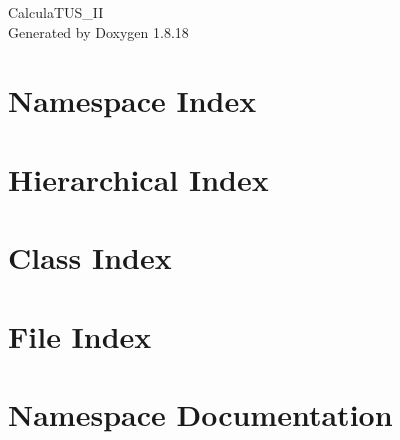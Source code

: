 \let\mypdfximage\pdfximage\def\pdfximage{\immediate\mypdfximage}\documentclass[twoside]{book}
\newcommand{\+}{\discretionary{\mbox{\scriptsize$\hookleftarrow$}}{}{}}
\newcommand{\clearemptydoublepage}{%
  \newpage{\pagestyle{empty}\cleardoublepage}%
}
\begin{document}
\hypersetup{pageanchor=false,
             bookmarksnumbered=true,
             pdfencoding=unicode
            }
\begin{titlepage}
\vspace*{7cm}
\begin{center}%
{\Large Calcula\+T\+U\+S\+\_\+\+II }\\
\vspace*{1cm}
{\large Generated by Doxygen 1.8.18}\\
\end{center}
\end{titlepage}
\clearemptydoublepage
{}
\tableofcontents
\clearemptydoublepage
{}
\hypersetup{pageanchor=true}

\chapter{Namespace Index}

\chapter{Hierarchical Index}

\chapter{Class Index}

\chapter{File Index}

\chapter{Namespace Documentation}






\end{document}
